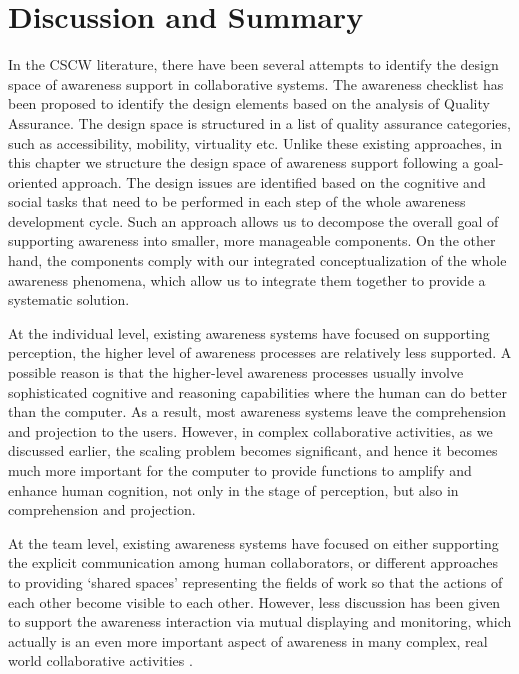 \section{Discussion and Summary} %
\label{sec:discussion_and_summary}
In the CSCW literature, there have been several attempts to identify the design space of awareness support in collaborative systems. The awareness checklist \cite{antunes2010a} has been proposed to identify the design elements based on the analysis of Quality Assurance. The design space is structured in a list of quality assurance categories, such as accessibility, mobility, virtuality etc. Unlike these existing approaches, in this chapter we structure the design space of awareness support following a goal-oriented approach. The design issues are identified based on the cognitive and social tasks that need to be performed in each step of the whole awareness development cycle. Such an approach allows us to decompose the overall goal of supporting awareness into smaller, more manageable components. On the other hand, the components comply with our integrated conceptualization of the whole awareness phenomena, which allow us to integrate them together to provide a systematic solution.

At the individual level, existing awareness systems have focused on supporting perception, the higher level of awareness processes are relatively less supported. A possible reason is that the higher-level awareness processes usually involve sophisticated cognitive and reasoning capabilities where the human can do better than the computer. As a result, most awareness systems leave the comprehension and projection to the users. However, in complex collaborative activities, as we discussed earlier, the scaling problem becomes significant, and hence it becomes much more important for the computer to provide functions to amplify and enhance human cognition, not only in the stage of perception, but also in comprehension and projection. 

At the team level, existing awareness systems have focused on either supporting the explicit communication among human collaborators, or different approaches to providing `shared spaces' representing the fields of work so that the actions of each other become visible to each other. However, less discussion has been given to support the awareness interaction via mutual displaying and monitoring, which actually is an even more important aspect of awareness in many complex, real world collaborative activities \cite{heath2002a}.






 


